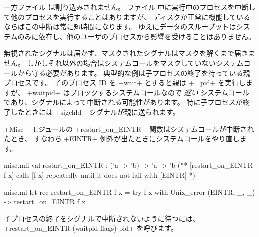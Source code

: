 一方ファイル \io は割り込みされません。
ファイル \io 中に実行中のプロセスを中断して他のプロセスを実行することはありますが、
ディスクが正常に機能しているならばこの中断は常に短時間になります。
ゆえにデータのスループットはシステムのみに依存し、他のユーザのプロセスから影響を受けることはありません。

無視されたシグナルは届かず、マスクされたシグナルはマスクを解くまで届きません。
しかしそれ以外の場合はシステムコールをマスクしていないシステムコールから守る必要があります。
典型的な例は子プロセスの終了を待っている親プロセスです。
子のプロセス ID を \ml+wait+ とすると親は  \ml+[] pid+ を実行しますが、
\ml+waitpid+ はブロックするシステムコールなので \emph{遅い} システムコールであり、シグナルによって中断される可能性があります。
特に子プロセスが終了したときには \ml+sigchld+ シグナルが親に送られます。

\ml+Misc+ モジュールの \ml+restart_on_EINTR+ 関数はシステムコールが中断されたとき、
すなわち \ml+EINTR+ 例外が出たときにシステムコールをやり直します。

%
\begin{codefile}{misc.mli}
val restart_on_EINTR : ('a -> 'b) -> 'a -> 'b
(** [restart_on_EINTR f x] calls [f x] repeatedly until it does not fail
with [EINTR] *)
\end{codefile}
%
\begin{listingcodefile}{misc.ml}
let rec restart_on_EINTR f x =
  try f x with Unix_error (EINTR, _, _) -> restart_on_EINTR f x
\end{listingcodefile}
子プロセスの終了をシグナルで中断されないように待つには、\ml+restart_on_EINTR (waitpid flags) pid+ を呼びます。

